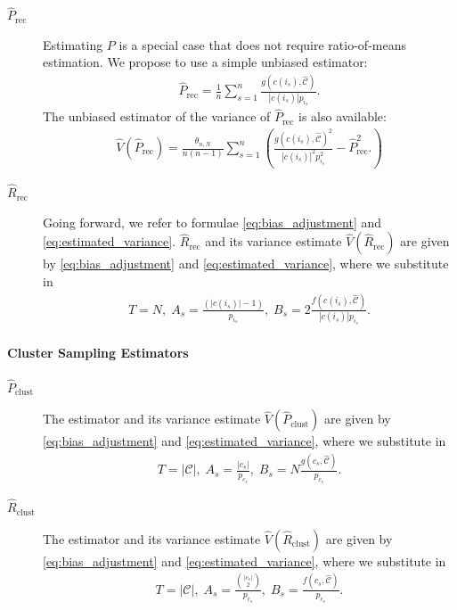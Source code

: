\documentclass[fontsize=11pt]{article}
\theoremstyle{definition}
\begin{document}
\begin{description}
    \item[$\widehat{P}_{\text{rec}}$]{Estimating $P$ is a special case that does not require ratio-of-means estimation. We propose to use a simple unbiased estimator:}
    \begin{align}\label{eq:P_rec}
        \widehat{P}_{\text{rec}} =
        \frac{1}{n}\sum_{s=1}^{n}\frac{g(c(i_s),\widehat{\mathcal{C}})}{|c(i_s)|p_{i_s}}.
    \end{align}
    The unbiased estimator of the variance of $\widehat{P}_{\text{rec}}$ is also available:
    \begin{align}
        \widehat{V}(\widehat{P}_{\text{rec}}) = 
        \frac{\theta_{n,N}}{n(n-1)}\sum_{s=1}^{n}\left(
        \frac{g(c(i_s),\widehat{\mathcal{C}})^2}{|c(i_s)|^2p_{i_s}^2} - 
        \widehat{P}_{\text{rec}}^2.
        \right)
    \end{align}
    \item[$\widehat{R}_{\text{rec}}$]{Going forward, we refer to formulae \eqref{eq:bias_adjustment} and \eqref{eq:estimated_variance}. $\widehat{R}_{\text{rec}}$ and its variance estimate $\widehat{V}(\widehat{R}_{\text{rec}})$ are given by \eqref{eq:bias_adjustment} and \eqref{eq:estimated_variance}, where we substitute in}
    \begin{align}
    T = N,\; A_s = \frac{(\lvert c(i_s) \rvert - 1)}{p_{i_s}},\; 
    B_s = 2\frac{f(c(i_s),\widehat{\mathcal{C}})}{|c(i_s)|p_{i_s}}.
    \end{align}
\end{description}

\paragraph{Cluster Sampling Estimators}

\begin{description}
    \item[$\widehat{P}_{\text{clust}}$]{The estimator and its variance estimate $\widehat{V}(\widehat{P}_{\text{clust}})$ are given by \eqref{eq:bias_adjustment} and \eqref{eq:estimated_variance}, where we substitute in}
    \begin{align}
        T = |\mathcal{C}|,\; A_s = \frac{|c_s|}{p_{c_s}},\; B_s = N\frac{g(c_s,\widehat{\mathcal{C}})}{p_{c_s}}.
    \end{align}
    \item[$\widehat{R}_{\text{clust}}$]{The estimator and its variance estimate $\widehat{V}(\widehat{R}_{\text{clust}})$ are given by \eqref{eq:bias_adjustment} and \eqref{eq:estimated_variance}, where we substitute in}
    \begin{align}
    T = |\mathcal{C}|,\; A_s = \frac{{\lvert c_s \rvert \choose 2}}{p_{c_s}},\; B_s = \frac{f(c_s,\widehat{\mathcal{C}})}{p_{c_s}}. 
    \end{align}
\end{description}
\end{document}
